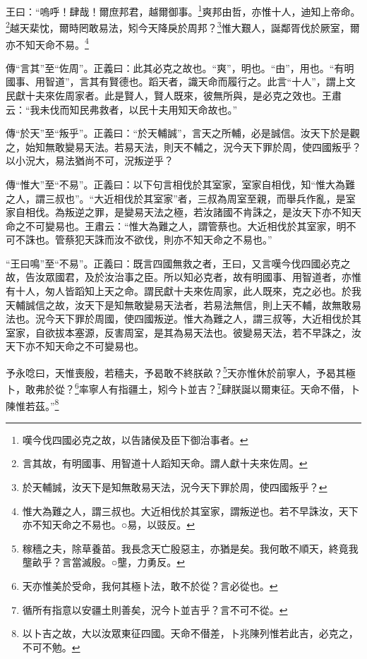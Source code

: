王曰：“嗚呼！肆哉！爾庶邦君，越爾御事。\footnote{嘆今伐四國必克之故，以告諸侯及臣下御治事者。}爽邦由哲，亦惟十人，迪知上帝命。\footnote{言其故，有明國事、用智道十人蹈知天命。謂人獻十夫來佐周。}越天棐忱，爾時罔敢易法，矧今天降戾於周邦？\footnote{於天輔誠，汝天下是知無敢易天法，況今天下罪於周，使四國叛乎？}惟大艱人，誕鄰胥伐於厥室，爾亦不知天命不易。\footnote{惟大為難之人，謂三叔也。大近相伐於其室家，謂叛逆也。若不早誅汝，天下亦不知天命之不易也。○易，以豉反。}


{\noindent\zhuan{}\fzbyks 傳“言其”至“佐周”。正義曰：此其必克之故也。“爽”，明也。“由”，用也。“有明國事、用智道”，言其有賢德也。蹈天者，識天命而履行之。此言“十人”，謂上文民獻十夫來佐周家者。此是賢人，賢人既來，彼無所與，是必克之效也。王肅云：“我未伐而知民弗救者，以民十夫用知天命故也。” \par}

{\noindent\zhuan{}\fzbyks 傳“於天”至“叛乎”。正義曰：“於天輔誠”，言天之所輔，必是誠信。汝天下於是觀之，始知無敢變易天法。若易天法，則天不輔之，況今天下罪於周，使四國叛乎？以小況大，易法猶尚不可，況叛逆乎？ \par}

{\noindent\zhuan{}\fzbyks 傳“惟大”至“不易”。正義曰：以下句言相伐於其室家，室家自相伐，知“惟大為難之人，謂三叔也”。“大近相伐於其室家”者，三叔為周室至親，而舉兵作亂，是室家自相伐。為叛逆之罪，是變易天法之極，若汝諸國不肯誅之，是汝天下亦不知天命之不可變易也。王肅云：“惟大為難之人，謂管蔡也。大近相伐於其室家，明不可不誅也。管蔡犯天誅而汝不欲伐，則亦不知天命之不易也。” \par}

{\noindent\shu{}\fzkt “王曰鳴”至“不易”。正義曰：既言四國無救之者，王曰，又言嘆今伐四國必克之故，告汝眾國君，及於汝治事之臣。所以知必克者，故有明國事、用智道者，亦惟有十人，匆人皆蹈知上天之命。謂民獻十夫來佐周家，此人既來，克之必也。於我天輔誠信之故，汝天下是知無敢變易天法者，若易法無信，則上天不輔，故無敢易法也。況今天下罪於周國，使四國叛逆。惟大為難之人，謂三叔等，大近相伐於其室家，自欲拔本塞源，反害周室，是其為易天法也。彼變易天法，若不早誅之，汝天下亦不知天命之不可變易也。 \par}

予永唸曰，天惟喪殷，若穡夫，予曷敢不終朕畝？\footnote{稼穡之夫，除草養苗。我長念天亡殷惡主，亦猶是矣。我何敢不順天，終竟我壟畝乎？言當滅殷。○壟，力勇反。}天亦惟休於前寧人，予曷其極卜，敢弗於從？\footnote{天亦惟美於受命，我何其極卜法，敢不於從？言必從也。}率寧人有指疆土，矧今卜並吉？\footnote{循所有指意以安疆土則善矣，況今卜並吉乎？言不可不從。}肆朕誕以爾東征。天命不僣，卜陳惟若茲。”\footnote{以卜吉之故，大以汝眾東征四國。天命不僣差，卜兆陳列惟若此吉，必克之，不可不勉。}


